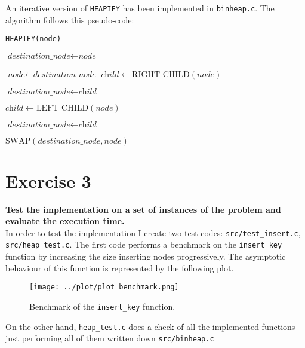 \documentclass{article}
\begin{document}
	\noindent An iterative version of \texttt{HEAPIFY} has been implemented in \texttt{binheap.c}. The algorithm follows this pseudo-code:
	\newpage
	\begin{algorithm}
		\caption{\texttt{HEAPIFY(node)}}\label{euclid}
	\begin{algorithmic}
		\State $\textit{destination\_node} \gets \textit{node}$
		\Do
		
		\State $\textit{node} \gets \textit{destination\_node}$
		\State $\textit{child} \gets \text{RIGHT CHILD}(\textit{node})$
		
		\State $\textit{destination\_node} \gets \textit{child}$
		\EndIf
		
		\State $\textit{child} \gets \text{LEFT CHILD}(\textit{node})$
		
		\State $\textit{destination\_node} \gets \textit{child}$
		\EndIf
		
		\State $\text{SWAP}(\textit{destination\_node}, \textit{node})$
		\EndIf
		
	\end{algorithmic}
	\end{algorithm}
	
	\section*{Exercise 3}
	\textbf{Test the implementation on a set of instances of the problem and evaluate the execution time.} \\
	
	\noindent In order to test the implementation I create two test codes: \texttt{src/test\_insert.c}, \texttt{src/heap\_test.c}. The first code performs a benchmark on the \texttt{insert\_key} function by increasing the size inserting nodes progressively. The asymptotic behaviour of this function is represented by the following plot.
	\begin{figure}[h]
		\centering
		\texttt{[image: ../plot/plot\_benchmark.png]}  
		\caption{Benchmark of the \texttt{insert\_key} function.}
		\label{plot}
	\end{figure}
	\newpage
	\noindent On the other hand, \texttt{heap\_test.c} does a check of all the implemented functions just performing all of them written down \texttt{src/binheap.c}
	
\end{document}
